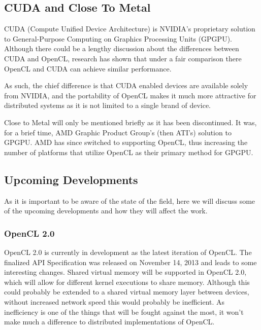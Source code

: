 \documentclass[../thesis.tex]{subfiles}
\begin{document}
    \subsection{CUDA and Close To Metal} %
    \label{sub:cuda_and_close_to_metal}
        CUDA (Compute Unified Device Architecture) is NVIDIA's proprietary solution to General-Purpose Computing on Graphics Processing Units (GPGPU). Although there could be a lengthy discussion about the differences between CUDA and OpenCL, research has shown that under a fair comparison there OpenCL and CUDA can achieve similar performance\cite{6047190}.

        As such, the chief difference is that CUDA enabled devices are available solely from NVIDIA\cite{cudagpus}, and the portability of OpenCL makes it much more attractive for distributed systems as it is not limited to a single brand of device.

        Close to Metal will only be mentioned briefly as it has been discontinued. It was, for a brief time, AMD Graphic Product Group's (then ATI's) solution to GPGPU. AMD has since switched to supporting OpenCL, thus increasing the number of platforms that utilize OpenCL as their primary method for GPGPU.


    \subsection{Upcoming Developments} %
    \label{sub:upcoming_developments}
    As it is important to be aware of the state of the field, here we will discuss some of the upcoming developments and how they will affect the work.
        \subsubsection{OpenCL 2.0} %
        \label{ssub:opencl_2_0}
        OpenCL 2.0 is currently in development as the latest iteration of OpenCL. The finalized API Specification was released on November 14, 2013 and leads to some interesting changes. Shared virtual memory will be supported in OpenCL 2.0, which will allow for different kernel executions to share memory. Although this could probably be extended to a shared virtual memory layer between devices, without increased network speed this would probably be inefficient. As inefficiency is one of the things that will be fought against the most, it won't make much a difference to distributed implementations of OpenCL.
\end{document}
